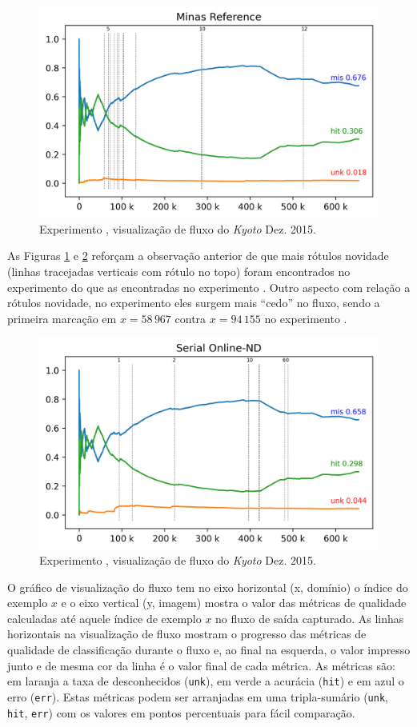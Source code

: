 \begin{figure}[htb]
  \centering
  \includegraphics[width=0.75\linewidth]{experiments/revised-java-log.png}
  \caption{Experimento \expA, visualização de fluxo do \dataset \emph{Kyoto} Dez. 2015.}
  \label{fig:validation-java}
\end{figure}

As Figuras \ref{fig:validation-java} e \ref{fig:validation-serial} reforçam a
observação anterior de que mais rótulos novidade (linhas tracejadas verticais
com rótulo no topo) foram encontrados no experimento \expA do que as encontradas 
no experimento \expB.
Outro aspecto com relação a rótulos novidade, no experimento \expA eles surgem
mais ``cedo'' no fluxo, sendo a primeira marcação em $x=58\,967$ contra $x=94\,155$ no
experimento \expB.

\begin{figure}[htb]
  \centering
  \includegraphics[width=0.75\linewidth]{experiments/online-nd-log.png}
  \caption{Experimento \expB, visualização de fluxo do \dataset \emph{Kyoto} Dez. 2015.}
  \label{fig:validation-serial}
\end{figure}

O gráfico de visualização do fluxo tem no eixo horizontal (x, domínio) o índice
do exemplo $x$ e o eixo vertical (y, imagem) mostra o valor das métricas de qualidade
calculadas até aquele índice de exemplo $x$ no fluxo de saída capturado.
As linhas horizontais na visualização de fluxo mostram o progresso das métricas
de qualidade de classificação durante o fluxo e, ao final na esquerda, o valor
impresso junto e de mesma cor da linha é o valor final de cada métrica.
As métricas são: 
em laranja a taxa de desconhecidos (\texttt{unk}),
em verde a acurácia (\texttt{hit}) e
em azul o erro (\texttt{err}).
Estas métricas podem ser arranjadas em uma tripla-sumário
(\texttt{unk}, \texttt{hit}, \texttt{err})
com os valores em pontos percentuais para fácil comparação.

